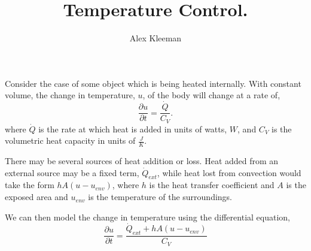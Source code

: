 \documentclass[12pt]{article}
\title{Temperature Control.}
\author{Alex Kleeman}
\begin{document}
\maketitle

Consider the case of some object which is being heated internally.  With constant volume, the change in temperature, $u$, of the body will change at a rate of,
\[
\frac{\partial u}{\partial t} = \frac{\dot{Q}}{C_V}.
\]
where $\dot{Q}$ is the rate at which heat is added in units of watts, $W$, and $C_V$ is the volumetric heat capacity in units of $\frac{J}{K}$.

There may be several sources of heat addition or loss.  Heat added from an external source may be a fixed term, $\dot{Q}_{ext}$, while heat lost from convection would take the form $h A (u - u_{env})$, where $h$ is the heat transfer coefficient and $A$ is the exposed area and $u_{env}$ is the temperature of the surroundings.

We can then model the change in temperature using the differential equation,
\[
\frac{\partial u}{\partial t} = \frac{\dot{Q}_{ext} + hA (u - u_{env})}{C_V}
\]
\end{document}
